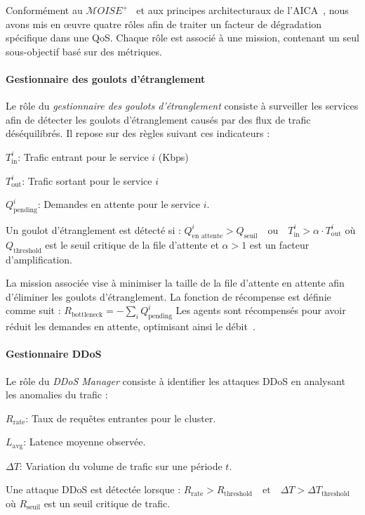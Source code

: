 \noindent Conformément au $\mathcal{M}OISE^+$~\cite{hubner2002moise} et aux principes architecturaux de l'AICA~\cite{kott2018autonomous}, nous avons mis en œuvre quatre rôles afin de traiter un facteur de dégradation spécifique dans une QoS.
Chaque rôle est associé à une mission, contenant un seul sous-objectif basé sur des métriques.

\noindent \paragraph{\textbf{Gestionnaire des goulots d'étranglement}}
%
Le rôle du \textit{gestionnaire des goulots d'étranglement} consiste à surveiller les services afin de détecter les goulots d'étranglement causés par des flux de trafic déséquilibrés. Il repose sur des règles suivant ces indicateurs :
\begin{enumerate*}[label={}, itemjoin={;\quad }]
    \item \( T_{\text{in}}^i \): Trafic entrant pour le service \( i \) (Kbps)
    \item \( T_{\text{out}}^i \): Trafic sortant pour le service \( i \)
    \item \( Q_{\text{pending}}^i \): Demandes en attente pour le service \( i \).
\end{enumerate*}
Un goulot d'étranglement est détecté si : $Q_{\text{en attente}}^i > Q_{\text{seuil}} \quad \text{ou} \quad T_{\text{in}}^i > \alpha \cdot T_{\text{out}}^i$
où \( Q_{\text{threshold}} \) est le seuil critique de la file d'attente et \( \alpha > 1 \) est un facteur d'amplification.

La mission associée vise à minimiser la taille de la file d'attente en attente afin d'éliminer les goulots d'étranglement. La fonction de récompense est définie comme suit : $R_{\text{bottleneck}} = - \sum_{i} Q_{\text{pending}}^i$
Les agents sont récompensés pour avoir réduit les demandes en attente, optimisant ainsi le débit~\cite{burns2016borg}.

\noindent \paragraph{\textbf{Gestionnaire DDoS}}

Le rôle du \textit{DDoS Manager} consiste à identifier les attaques DDoS en analysant les anomalies du trafic :
\begin{enumerate*}[label={}, itemjoin={;\quad }]
    \item \( R_{\text{rate}} \): Taux de requêtes entrantes pour le cluster.
    \item \( L_{\text{avg}} \): Latence moyenne observée.
    \item \( \Delta T \): Variation du volume de trafic sur une période \( t \).
\end{enumerate*}
Une attaque DDoS est détectée lorsque :
$R_{\text{rate}} > R_{\text{threshold}} \quad \text{et} \quad \Delta T > \Delta T_{\text{threshold}}$
où \( R_{\text{seuil}} \) est un seuil critique de trafic.

